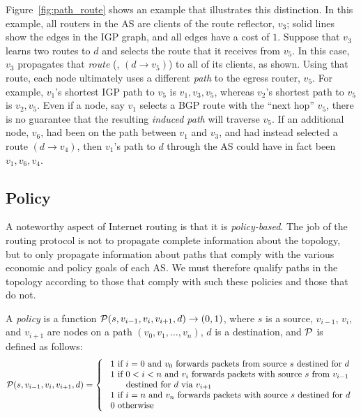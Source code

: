 Figure~\ref{fig:path_route} shows an example that illustrates this
distinction.  In this example, all routers in the AS are clients of the
route reflector, $v_3$; solid lines show the edges in the IGP graph, and
all edges have a cost of $1$.  Suppose that $v_3$ learns two routes to
$d$ and selects the route that it receives from $v_5$.  In this case,
$v_3$ propagates that {\em route} (\ie, $(d \rightarrow v_5)$) to all of
its clients, as shown.   Using that route, each node ultimately uses a
different {\em path} to the egress router, $v_5$.  For example, $v_1$'s
shortest IGP path to $v_5$ is $v_1,v_3,v_5$, whereas $v_2$'s shortest
path to $v_5$ is $v_2, v_5$.  Even if a node, say $v_1$ selects a BGP
route with the ``next hop'' $v_5$, there is no guarantee that the
resulting {\em induced path} will traverse $v_5$.  If an additional
node, $v_6$, 
had been on the path between $v_1$ and $v_3$, and had instead selected a
route $(d\rightarrow v_4)$, then $v_1$'s path to $d$ through the AS
could have in fact been $v_1, v_6, v_4$.





\subsection{Policy}

A noteworthy aspect of Internet routing is that it is {\em policy-based}.
The job of the routing protocol is not to propagate complete
information about the topology, but to only propagate information about
paths that comply with the various economic and policy goals of each AS.
We must therefore qualify paths in the topology according to
those that comply with such these policies and those that do not.

\begin{defn}[Policy]\label{defn:policy}
A {\em policy} is a function $\P(s, v_{i-1},v_{i},v_{i+1},d) \rightarrow
(0,1)$, 
where $s$ is a source, $v_{i-1}$, $v_i$, and $v_{i+1}$ are 
nodes on a path $(v_0, v_1, \ldots, v_n)$, $d$ is a
destination, and $\P$ is defined as follows: 
\[
\P(s,v_{i-1},v_i,v_{i+1},d) = \left\{\
\begin{array}{l}
1\textrm{ if $i=0$ and $v_0$ forwards packets from source $s$ destined
  for $d$}\\ 
1\textrm{ if $0<i<n$ and $v_i$ forwards packets with source $s$ from
  $v_{i-1}$} \\ \textrm{\hspace*{0.2in} destined for $d$ via $v_{i+1}$}\\
1\textrm{ if $i=n$ and $v_n$ forwards packets with source $s$ destined
  for $d$}\\ 
0\textrm{ otherwise }
\end{array}
\right.
\]
\end{defn}

